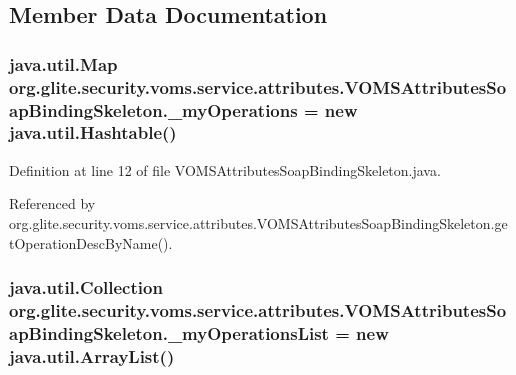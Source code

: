 \subsection{Member Data Documentation}
\hypertarget{classorg_1_1glite_1_1security_1_1voms_1_1service_1_1attributes_1_1VOMSAttributesSoapBindingSkeleton_ac28e4ef27165a9283f9e3b07fdbab7af}{
\subsubsection[{\_\-myOperations}]{\setlength{\rightskip}{0pt plus 5cm}java.util.Map {\bf org.glite.security.voms.service.attributes.VOMSAttributesSoapBindingSkeleton.\_\-myOperations} = new java.util.Hashtable()}}
\label{classorg_1_1glite_1_1security_1_1voms_1_1service_1_1attributes_1_1VOMSAttributesSoapBindingSkeleton_ac28e4ef27165a9283f9e3b07fdbab7af}


Definition at line 12 of file VOMSAttributesSoapBindingSkeleton.java.



Referenced by org.glite.security.voms.service.attributes.VOMSAttributesSoapBindingSkeleton.getOperationDescByName().

\hypertarget{classorg_1_1glite_1_1security_1_1voms_1_1service_1_1attributes_1_1VOMSAttributesSoapBindingSkeleton_a73e65e04742c0895b1b0e8957c98675d}{
\subsubsection[{\_\-myOperationsList}]{\setlength{\rightskip}{0pt plus 5cm}java.util.Collection {\bf org.glite.security.voms.service.attributes.VOMSAttributesSoapBindingSkeleton.\_\-myOperationsList} = new java.util.ArrayList()}}
\label{classorg_1_1glite_1_1security_1_1voms_1_1service_1_1attributes_1_1VOMSAttributesSoapBindingSkeleton_a73e65e04742c0895b1b0e8957c98675d}


